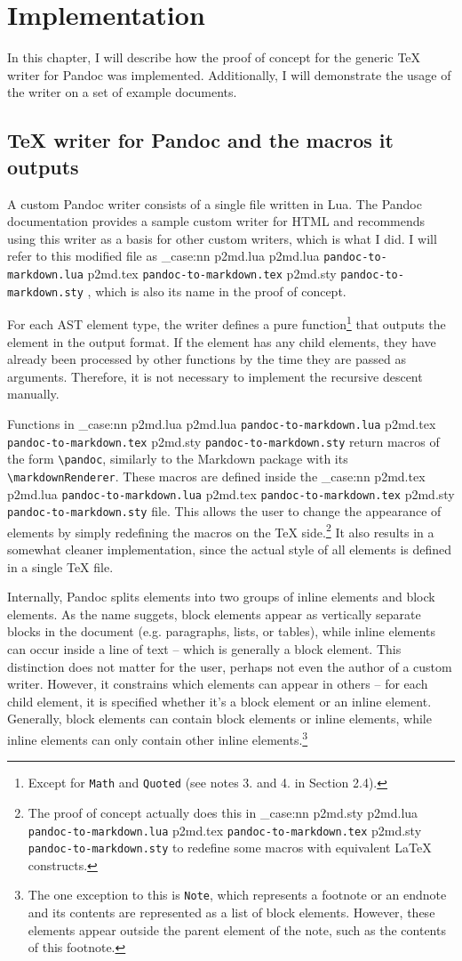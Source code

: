\documentclass[
  digital,     %
  oneside,     %
  nosansbold,  %
  nocolorbold, %
  lof,         %
  nolot,       %
]{fithesis4}
\newcommand\macro[1]{\texttt{\textbackslash{}{#1}}}
\newcommand\pandoc[1]{\macro{pandoc\-{#1}}}
\newcommand\renderer[1]{\macro{markdown\-Renderer\-{#1}}}
\newcommand\file[1]
  {
    \str_case:nn
      { #1 }
      {
        { p2md.lua } { \texttt{pandoc\hyp{}to\hyp{}markdown.lua} }
        { p2md.tex } { \texttt{pandoc\hyp{}to\hyp{}markdown.tex} }
        { p2md.sty } { \texttt{pandoc\hyp{}to\hyp{}markdown.sty} }
      }
  }
\begin{document}
\chapter{Implementation}
In this chapter, I will describe how the proof of concept for the generic \TeX{} writer for Pandoc was implemented. Additionally, I will demonstrate the usage of the writer on a set of example documents.

\section{\TeX{} writer for Pandoc and the macros it outputs}
A custom Pandoc writer consists of a single file written in Lua. The Pandoc documentation provides a sample custom writer for HTML and recommends using this writer as a basis for other custom writers, which is what I did. I will refer to this modified file as \file{p2md.lua}, which is also its name in the proof of concept.

For each AST element type, the writer defines a pure function\footnote{Except for \texttt{Math} and \texttt{Quoted} (see notes 3. and 4. in Section 2.4).} that outputs the element in the output format. If the element has any child elements, they have already been processed by other functions by the time they are passed as arguments. Therefore, it is not necessary to implement the recursive descent manually.

Functions in \file{p2md.lua} return macros of the form \pandoc{ElementName}, similarly to the Markdown package with its \renderer{ElementName}. These macros are defined inside the \file{p2md.tex} file. This allows the user to change the appearance of elements by simply redefining the macros on the \TeX{} side.\footnote{The proof of concept actually does this in \file{p2md.sty} to redefine some macros with equivalent \LaTeX{} constructs.} It also results in a somewhat cleaner implementation, since the actual style of all elements is defined in a single \TeX{} file.

Internally, Pandoc splits elements into two groups of inline elements and block elements. As the name suggets, block elements appear as vertically separate blocks in the document (e.g. paragraphs, lists, or tables), while inline elements can occur inside a line of text -- which is generally a block element. This distinction does not matter for the user, perhaps not even the author of a custom writer. However, it constrains which elements can appear in others -- for each child element, it is specified whether it's a block element or an inline element. Generally, block elements can contain block elements or inline elements, while inline elements can only contain other inline elements.\footnote{The one exception to this is \texttt{Note}, which represents a footnote or an endnote and its contents are represented as a list of block elements. However, these elements appear outside the parent element of the note, such as the contents of this footnote.}
\end{document}
